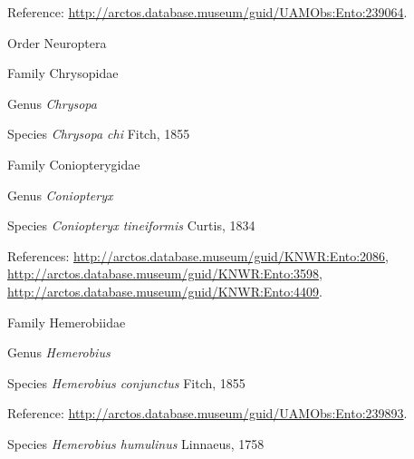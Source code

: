 \documentclass[9pt, article]{memoir}
\begin{document}
\begin{multicols}{2}
\vspace{6pt}Reference: 
\url{http://arctos.database.museum/guid/UAMObs:Ento:239064}.

\vspace{6pt}\noindent\hspace{18pt}Order Neuroptera


\vspace{6pt}\noindent\hspace{24pt}Family Chrysopidae


\vspace{6pt}\noindent\hspace{30pt}Genus \textit{Chrysopa}


\vspace{6pt}\noindent\hspace{36pt}Species \textit{Chrysopa chi} Fitch, 1855


\vspace{6pt}\noindent\hspace{24pt}Family Coniopterygidae


\vspace{6pt}\noindent\hspace{30pt}Genus \textit{Coniopteryx}


\vspace{6pt}\noindent\hspace{36pt}Species \textit{Coniopteryx tineiformis} Curtis, 1834


\vspace{6pt}References: 
\url{http://arctos.database.museum/guid/KNWR:Ento:2086}, 
\url{http://arctos.database.museum/guid/KNWR:Ento:3598}, 
\url{http://arctos.database.museum/guid/KNWR:Ento:4409}.

\vspace{6pt}\noindent\hspace{24pt}Family Hemerobiidae


\vspace{6pt}\noindent\hspace{30pt}Genus \textit{Hemerobius}


\vspace{6pt}\noindent\hspace{36pt}Species \textit{Hemerobius conjunctus} Fitch, 1855


\vspace{6pt}Reference: 
\url{http://arctos.database.museum/guid/UAMObs:Ento:239893}.

\vspace{6pt}\noindent\hspace{36pt}Species \textit{Hemerobius humulinus} Linnaeus, 1758



\end{multicols}
\end{document}
